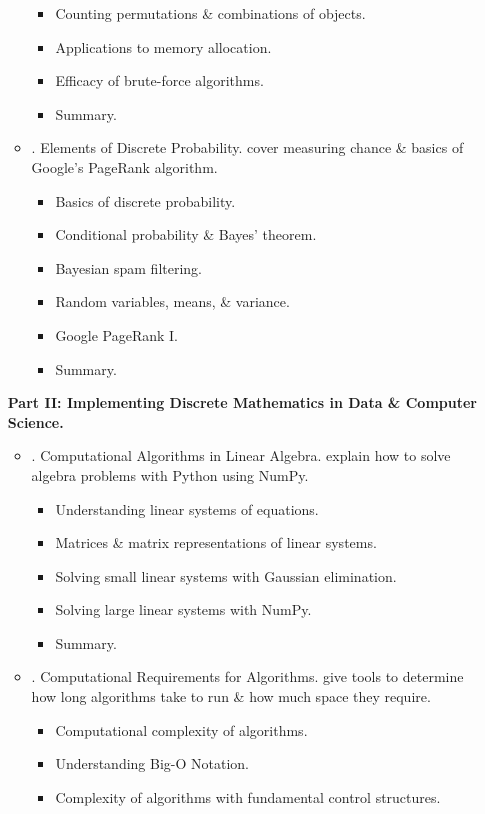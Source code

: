 \documentclass{article}
\begin{document}
\begin{enumerate}
\begin{itemize}
\begin{itemize}
			\item {\sf Counting permutations \& combinations of objects.}
			\item {\sf Applications to memory allocation.}
			\item {\sf Efficacy of brute-force algorithms.}
			\item {\sf Summary.}
		\end{itemize}
		\item {. Elements of Discrete Probability.} cover measuring chance \& basics of Google's PageRank algorithm.
		\begin{itemize}
			\item {\sf Basics of discrete probability.}
			\item {\sf Conditional probability \& Bayes' theorem.}
			\item {\sf Bayesian spam filtering.}
			\item {\sf Random variables, means, \& variance.}
			\item {\sf Google PageRank I.}
			\item {\sf Summary.}
		\end{itemize}
	\end{itemize}
	{\bf Part II: Implementing Discrete Mathematics in Data \& Computer Science.}
	\begin{itemize}
		\item {. Computational Algorithms in Linear Algebra.} explain how to solve algebra problems with Python using NumPy.
		\begin{itemize}
			\item {\sf Understanding linear systems of equations.}
			\item {\sf Matrices \& matrix representations of linear systems.}
			\item {\sf Solving small linear systems with Gaussian elimination.}
			\item {\sf Solving large linear systems with NumPy.}
			\item {\sf Summary.}
		\end{itemize}
		\item {. Computational Requirements for Algorithms.} give tools to determine how long algorithms take to run \& how much space they require.
		\begin{itemize}
			\item {\sf Computational complexity of algorithms.}
			\item {\sf Understanding Big-O Notation.}
			\item {\sf Complexity of algorithms with fundamental control structures.}

\end{itemize}
\end{itemize}
\end{enumerate}
\end{document}
